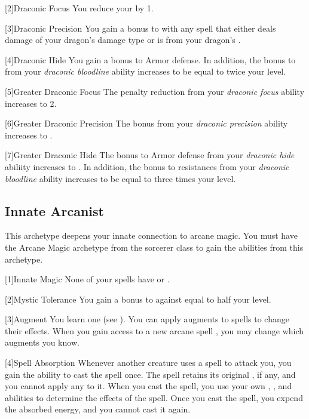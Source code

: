         [2]{Draconic Focus} You reduce your  by 1.

        [3]{Draconic Precision} You gain a  bonus to  with any spell that either deals damage of your dragon's damage type or is from your dragon's .

        [4]{Draconic Hide} You gain a  bonus to Armor defense.
        In addition, the bonus to  from your \textit{draconic bloodline} ability increases to be equal to twice your level.

        [5]{Greater Draconic Focus} The penalty reduction from your \textit{draconic focus} ability increases to 2.

        [6]{Greater Draconic Precision} The bonus from your \textit{draconic precision} ability increases to .

        [7]{Greater Draconic Hide} The bonus to Armor defense from your \textit{draconic hide} abiliity increases to .
        In addition, the bonus to resistances from your \textit{draconic bloodline} ability increases to be equal to three times your level.

    \subsection{Innate Arcanist}
        This archetype deepens your innate connection to arcane magic.
        You must have the Arcane Magic archetype from the sorcerer class to gain the abilities from this archetype.

        [1]{Innate Magic} None of your spells have  or .

        [2]{Mystic Tolerance} You gain a bonus to  against  equal to half your level.

        [3]{Augment} You learn one  (see ).
        You can apply augments to spells to change their effects.
        When you gain access to a new arcane spell , you may change which augments you know.

        [4]{Spell Absorption} Whenever another creature uses a spell to attack you, you gain the ability to cast the spell once.
        The spell retains its original , if any, and you cannot apply any  to it.
        When you cast the spell, you use your own , , and abilities to determine the effects of the spell.
        Once you cast the spell, you expend the absorbed energy, and you cannot cast it again.

